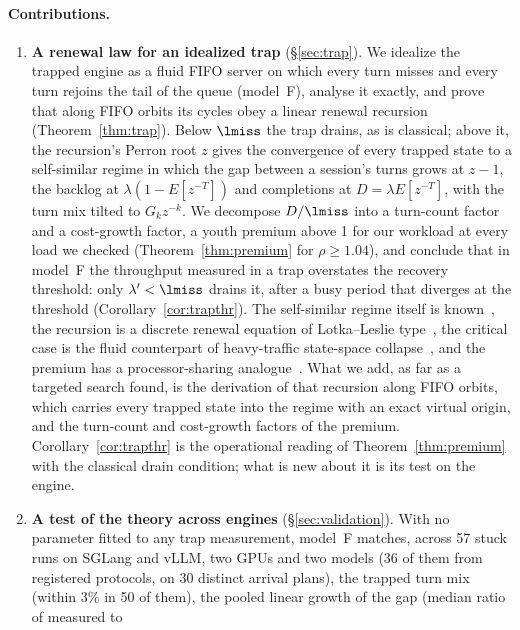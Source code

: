 \paragraph{Contributions.}
\begin{enumerate}[label=(\arabic*),leftmargin=*]
\item \textbf{A renewal law for an idealized trap} (\S\ref{sec:trap}). We idealize the trapped engine as a fluid FIFO server on
which every turn misses and every turn rejoins the tail of the queue (model~F), analyse it exactly, and prove that along FIFO orbits
its cycles obey a linear renewal recursion (Theorem~\ref{thm:trap}). Below $\lmiss$ the trap drains, as is
classical; above it, the recursion's Perron root $z$ gives the convergence of every trapped state to a self-similar regime in which
the gap between a session's turns grows at $z-1$, the backlog at $\lambda(1-E[z^{-T}])$ and completions at $D=\lambda E[z^{-T}]$, with the turn mix tilted to
$G_kz^{-k}$. We decompose $D/\lmiss$ into a turn-count factor and a cost-growth factor, a youth premium above 1 for our workload
at every load we checked (Theorem~\ref{thm:premium} for $\rho\ge1.04$), and conclude that in model~F the throughput measured in a trap overstates the recovery threshold: only
$\lambda'<\lmiss$ drains it, after a busy period that diverges at the threshold (Corollary~\ref{cor:trapthr}). The self-similar
regime itself is known~\citep{khanin2001steady}, the recursion is a discrete renewal equation of Lotka--Leslie
type~\citep{feller1968introduction}, the critical case is the fluid counterpart of heavy-traffic state-space
collapse~\citep{reiman1988multiclass,dai1995multiclass}, and the premium has a processor-sharing
analogue~\citep{jeanmarie1994transient}. What we add, as far as a targeted search found, is the derivation of that recursion along
FIFO orbits, which carries every trapped state into the regime with an exact virtual origin, and the turn-count and cost-growth
factors of the premium. Corollary~\ref{cor:trapthr} is the operational reading of Theorem~\ref{thm:premium} with the classical drain
condition; what is new about it is its test on the engine.
\item \textbf{A test of the theory across engines} (\S\ref{sec:validation}). With no parameter fitted to any trap measurement, model~F
matches, across 57 stuck runs on SGLang and vLLM, two GPUs and two models (36 of them from registered protocols, on 30 distinct
arrival plans), the trapped turn mix (within 3\% in 50 of them), the pooled linear growth of the gap (median ratio of measured to

\end{enumerate}
